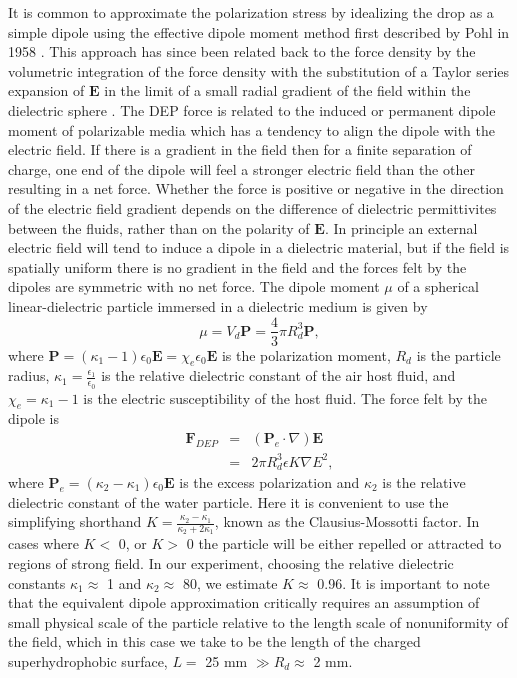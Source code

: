 \documentclass[12pt,a4paper,oneside]{book}
\begin{document}
It is common to approximate the polarization stress by idealizing the drop as a simple dipole using the effective dipole moment method first described by Pohl in 1958 \cite{pohl_effects_1958}. This approach has since been related back to the force density by the volumetric integration of the force density with the substitution of a Taylor series expansion of $\mathbf{E}$ in the limit of a small radial gradient of the field within the dielectric sphere \cite{wang_general_1997}. The DEP force is related to the induced or permanent dipole moment of polarizable media which has a tendency to align the dipole with the electric field. If there is a gradient in the field then for a finite separation of charge, one end of the dipole will feel a stronger electric field than the other resulting in a net force. Whether the force is positive or negative in the direction of the electric field gradient depends on the difference of dielectric permittivites between the fluids, rather than on the polarity of $\mathbf{E}$. In principle an external electric field will tend to induce a dipole in a dielectric material, but if the field is spatially uniform there is no gradient in the field and the forces felt by the dipoles are symmetric with no net force. The dipole moment $\mu$ of a spherical linear-dielectric particle immersed in a dielectric medium is given by
\begin{equation} \label{dipole_m_1}
\mu = V_d \mathbf{P} = \frac{4}{3} \pi R_d^3 \mathbf{P},
\end{equation} 
where $\mathbf{P} = \left(\kappa_1 - 1 \right) \epsilon_0 \mathbf{E} = \chi_e \epsilon_0 \mathbf{E}$ is the polarization moment, $R_d$ is the particle radius, $\kappa_1 = \frac{\epsilon_1}{\epsilon_0}$ is the relative dielectric constant of the air host fluid, and $\chi_e = \kappa_1 - 1$ is the electric susceptibility of the host fluid. The force felt by the dipole is 
\begin{eqnarray} \label{dep_force}
\mathbf{F}_{DEP} &=& \left( \mathbf{P}_e \cdot \nabla \right) \mathbf{E} \nonumber \\
&=& 2 \pi R_d^3 \epsilon K \nabla E^2,
\end{eqnarray}
where $\mathbf{P}_e=(\kappa_2 - \kappa_1)\epsilon_0 \mathbf{E}$ is the excess polarization and $\kappa_2$ is the relative dielectric constant of the water particle. Here it is convenient to use the simplifying shorthand $K = \frac{\kappa_2 - \kappa_1}{\kappa_2 + 2 \kappa_1}$, known as the Clausius-Mossotti factor. In cases where $K <$ 0, or $K>$ 0 the particle will be either repelled or attracted to regions of strong field. In our experiment, choosing the relative dielectric constants $\kappa_1 \approx$ 1 and $\kappa_2 \approx$ 80, we estimate $K \approx$ 0.96. It is important to note that the equivalent dipole approximation critically requires an assumption of small physical scale of the particle relative to the length scale of nonuniformity of the field, which in this case we take to be the length of the charged superhydrophobic surface, $L =$ 25 mm $\gg R_d \approx$ 2 mm.
\end{document}
